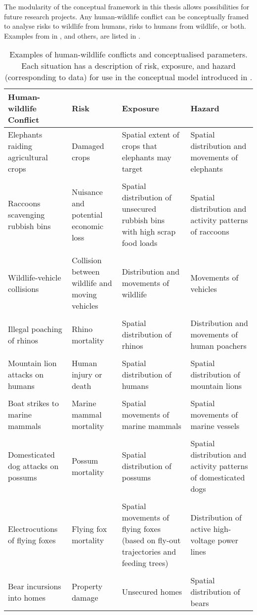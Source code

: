 The modularity of the conceptual framework in this thesis allows possibilities for future research projects. Any human-wildlife conflict can be conceptually framed to analyse risks to wildlife from humans, risks to humans from wildlife, or both. Examples from  in , and others, are listed in .

\begin{table}[t]
\caption[Examples of human-wildlife conflicts and conceptualised parameters]{Examples of human-wildlife conflicts and conceptualised parameters. Each situation has a description of risk, exposure, and hazard (corresponding to data) for use in the conceptual model introduced in .}
\centering
\begin{tabularx}{0.9\textwidth}{@{}YYYY@{}} \toprule
Human-wildlife Conflict					&Risk			&Exposure		&Hazard \\ \midrule
Elephants raiding agricultural crops	&Damaged crops	&Spatial extent of crops that elephants may target	&Spatial distribution and movements of elephants \\
&&& \\
Raccoons scavenging rubbish bins		&Nuisance and potential economic loss	&Spatial distribution of unsecured rubbish bins with high scrap food loads	&Spatial distribution and activity patterns of raccoons \\
&&& \\
Wildlife-vehicle collisions				&Collision between wildlife and moving vehicles	&Distribution and movements of wildlife	&Movements of vehicles \\
&&& \\
Illegal poaching of rhinos				&Rhino mortality	&Spatial distribution of rhinos	&Distribution and movements of human poachers \\
&&& \\
Mountain lion attacks on humans			&Human injury or death	&Spatial distribution of humans	&Spatial distribution of mountain lions \\
&&& \\
Boat strikes to marine mammals			&Marine mammal mortality	&Spatial movements of marine mammals	&Spatial movements of marine vessels \\
&&& \\
Domesticated dog attacks on possums 	&Possum mortality	&Spatial distribution of possums	&Spatial distribution and activity patterns of domesticated dogs \\
&&& \\
Electrocutions of flying foxes			&Flying fox mortality	&Spatial movements of flying foxes (based on fly-out trajectories and feeding trees)	&Distribution of active high-voltage power lines \\
&&& \\
Bear incursions into homes				&Property damage	&Unsecured homes	&Spatial distribution of bears \\
\bottomrule
\end{tabularx}
\label{hmi_risk}
\vspace{1.9cm}
\end{table}

